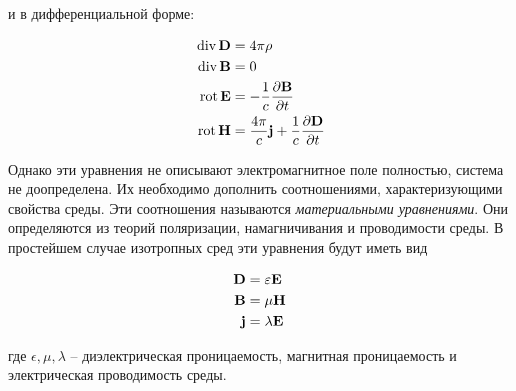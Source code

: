 \noindent
и в дифференциальной форме:

\begin{align}
    \, \text{div} \, \mathbf D &= 4 \pi \rho \\
    \, \text{div} \, \mathbf B &= 0 \\
    \, \text{rot} \, \mathbf E &= - \frac{1}{c} \frac{\partial \mathbf B}{\partial t} \\
    \, \text{rot} \, \mathbf H &= \frac{4 \pi}{c} \mathbf j + \frac{1}{c} \frac{\partial \mathbf D}{\partial t}
\end{align}

Однако эти уравнения не описывают электромагнитное поле полностью, система не доопределена. Их необходимо дополнить соотношениями, характеризующими свойства среды. Эти соотношения называются \textit{материальными уравнениями}. Они определяются из теорий поляризации, намагничивания и проводимости среды. В простейшем случае изотропных сред эти уравнения будут иметь вид

\begin{align}
    \mathbf D &= \varepsilon \mathbf E \\
    \mathbf B &= \mu \mathbf H \\
    \mathbf j &= \lambda \mathbf E
\end{align}

\noindent
где $\epsilon, \mu, \lambda$ -- диэлектрическая проницаемость, магнитная проницаемость и электрическая проводимость среды.